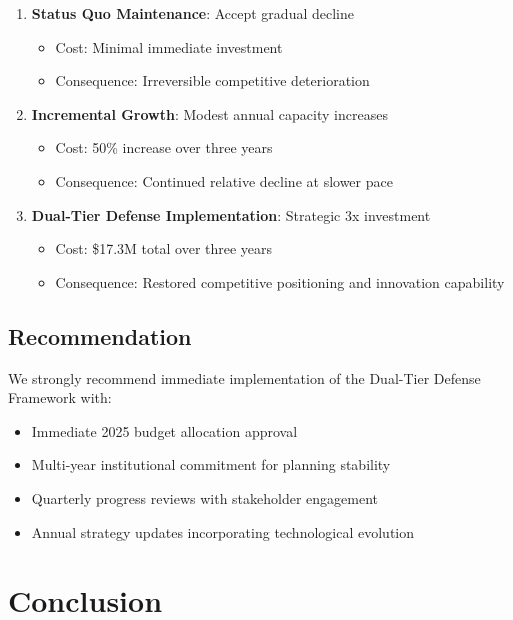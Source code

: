 \documentclass{article}
\begin{document}
\begin{enumerate}
\item \textbf{Status Quo Maintenance}: Accept gradual decline
   \begin{itemize}
   \item Cost: Minimal immediate investment
   \item Consequence: Irreversible competitive deterioration
   \end{itemize}

\item \textbf{Incremental Growth}: Modest annual capacity increases
   \begin{itemize}
   \item Cost: 50\% increase over three years
   \item Consequence: Continued relative decline at slower pace
   \end{itemize}

\item \textbf{Dual-Tier Defense Implementation}: Strategic 3x investment
   \begin{itemize}
   \item Cost: \$17.3M total over three years
   \item Consequence: Restored competitive positioning and innovation capability
   \end{itemize}
\end{enumerate}

\subsection{Recommendation}

We strongly recommend immediate implementation of the Dual-Tier Defense Framework with:

\begin{itemize}
\item Immediate 2025 budget allocation approval
\item Multi-year institutional commitment for planning stability
\item Quarterly progress reviews with stakeholder engagement
\item Annual strategy updates incorporating technological evolution
\end{itemize}


\section{Conclusion}
\end{document}
